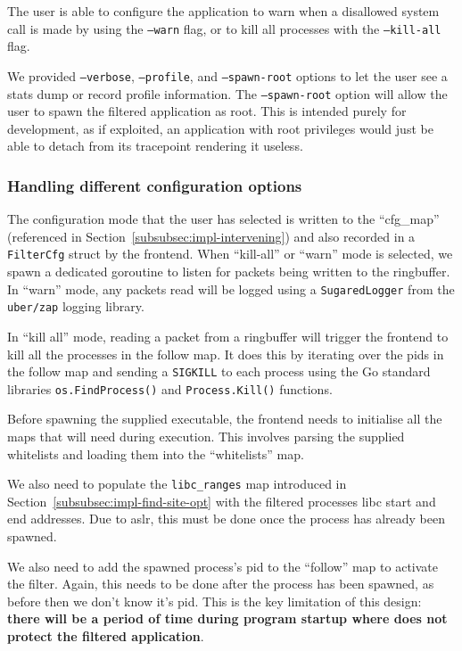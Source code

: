 The user is able to configure the application to warn when a disallowed system call
is made by using the \texttt{--warn} flag, or to kill all processes with the
\texttt{--kill-all} flag. 

We provided \texttt{--verbose}, \texttt{--profile}, and \texttt{--spawn-root}
options to let the user see a stats dump or record profile information. The
\texttt{--spawn-root} option will allow the user to spawn the filtered
application as root. This is intended purely for development, as if exploited,
an application with root privileges would just be able to detach \af from its
tracepoint rendering it useless.


\subsubsection{Handling different configuration options}

The configuration mode that the user has selected is written to the
``cfg\_map'' (referenced in Section~\ref{subsubsec:impl-intervening}) and also
recorded in a \texttt{FilterCfg} struct by the frontend. When ``kill-all'' or
``warn'' mode is selected, we spawn a dedicated goroutine to listen for packets
being written to the ringbuffer. In ``warn'' mode, any packets read will be
logged using a \texttt{SugaredLogger} from the \texttt{uber/zap} logging
library. 

In ``kill all'' mode, reading a packet from a ringbuffer will trigger
the frontend to kill all the processes in the follow map. It does this by
iterating over the \acp{pid} in the follow map and sending a \texttt{SIGKILL} to
each process using the Go standard libraries \texttt{os.FindProcess()} and
\texttt{Process.Kill()} functions.

Before spawning the supplied executable, the frontend needs to initialise all
the maps that \af will need during execution. This involves parsing the
supplied whitelists and loading them into the ``whitelists'' map. 

We also need to populate the \texttt{libc\_ranges} map introduced in
Section~\ref{subsubsec:impl-find-site-opt} with the filtered processes \ac{libc}
start and end addresses. Due to \ac{aslr}, this must be done once the process
has already been spawned. 

We also need to add the spawned process's \ac{pid} to the ``follow'' map to
activate the filter. Again, this needs to be done after the process has been
spawned, as before then we don't know it's \ac{pid}. This is the key limitation of 
this design: \textbf{there will be a period of time during program startup where \af 
does not protect the filtered application}.

